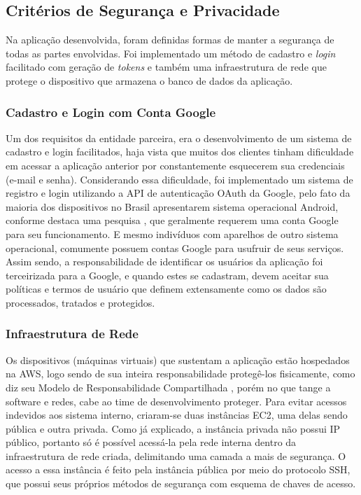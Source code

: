 \subsection{Critérios de Segurança e Privacidade}
Na aplicação desenvolvida, foram definidas formas de manter a segurança de todas as partes envolvidas. Foi implementado um método de cadastro e \textit{login} facilitado com geração de \textit{tokens} e também uma infraestrutura de rede que protege o dispositivo que armazena o banco de dados da aplicação.

\subsubsection{Cadastro e Login com Conta Google}
Um dos requisitos da entidade parceira, era o desenvolvimento de um sistema de cadastro e login facilitados, haja vista que muitos dos clientes tinham dificuldade em acessar a aplicação anterior por constantemente esquecerem sua credenciais (e-mail e senha).
Considerando essa dificuldade, foi implementado um sistema de registro e login utilizando a API de autenticação OAuth da Google, pelo fato da maioria dos dispositivos no Brasil apresentarem sistema operacional Android, conforme destaca uma pesquisa \cite{app-my-site}, que geralmente requerem uma conta Google para seu funcionamento. E mesmo indivíduos com aparelhos de outro sistema operacional, comumente possuem contas Google para usufruir de seus serviços.
Assim sendo, a responsabilidade de identificar os usuários da aplicação foi terceirizada para a Google, e quando estes se cadastram, devem aceitar sua políticas e termos de usuário que definem extensamente como os dados são processados, tratados e protegidos.

\subsubsection{Infraestrutura de Rede}
Os dispositivos (máquinas virtuais) que sustentam a aplicação estão hospedados na AWS, logo sendo de sua inteira responsabilidade protegê-los fisicamente, como diz seu Modelo de Responsabilidade Compartilhada \cite{aws-shared-responsibilities}, porém no que tange a software e redes, cabe ao time de desenvolvimento proteger.
Para evitar acessos indevidos aos sistema interno, criaram-se duas instâncias EC2, uma delas sendo pública e outra privada. Como já explicado, a instância privada não possui IP público, portanto só é possível acessá-la pela rede interna dentro da infraestrutura de rede criada, delimitando uma camada a mais de segurança.
O acesso a essa instância é feito pela instância pública por meio do protocolo SSH, que possui seus próprios métodos de segurança com esquema de chaves de acesso.

